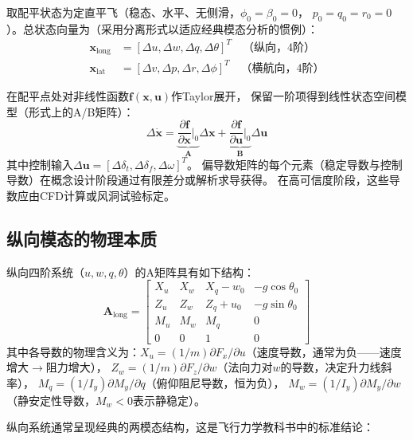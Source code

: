 \documentclass[a4paper,12pt]{ctexart}
\theoremstyle{plain}
\theoremstyle{definition}
\begin{document}
取配平状态为定直平飞（稳态、水平、无侧滑，$\phi_0 = \beta_0 = 0$，
$p_0 = q_0 = r_0 = 0$）。总状态向量为（采用分离形式以适应经典模态分析的惯例）：
\begin{align}
    \bm{x}_{\text{long}} &= [\Delta u, \Delta w, \Delta q, \Delta \theta]^T \quad \text{（纵向，4阶）} \\
    \bm{x}_{\text{lat}} &= [\Delta v, \Delta p, \Delta r, \Delta \phi]^T \quad \text{（横航向，4阶）}
\end{align}

在配平点处对非线性函数$\bm{f}(\bm{x}, \bm{u})$作Taylor展开，
保留一阶项得到线性状态空间模型（形式上的A/B矩阵）：
\begin{equation}
    \Delta \dot{\bm{x}} = \underbrace{\frac{\partial \bm{f}}{\partial \bm{x}}\bigg|_0}_{\bm{A}}
    \Delta \bm{x} + \underbrace{\frac{\partial \bm{f}}{\partial \bm{u}}\bigg|_0}_{\bm{B}}
    \Delta \bm{u}
    \label{eq:linear_state_space}
\end{equation}
其中控制输入$\Delta \bm{u} = [\Delta \delta_t, \Delta \delta_f, \Delta \omega]^T$。
偏导数矩阵的每个元素（稳定导数与控制导数）在概念设计阶段通过有限差分或解析求导获得。
在高可信度阶段，这些导数应由CFD计算或风洞试验标定。

\subsection{纵向模态的物理本质}

纵向四阶系统（$u, w, q, \theta$）的A矩阵具有如下结构：
\begin{equation}
    \bm{A}_{\text{long}} =
    \begin{bmatrix}
        X_u & X_w & X_q - w_0 & -g\cos\theta_0 \\
        Z_u & Z_w & Z_q + u_0 & -g\sin\theta_0 \\
        M_u & M_w & M_q & 0 \\
        0 & 0 & 1 & 0
    \end{bmatrix}
    \label{eq:longitudinal}
\end{equation}
其中各导数的物理含义为：$X_u = (1/m)\partial F_x/\partial u$（速度导数，通常为负——速度增大$\to$阻力增大），
$Z_w = (1/m)\partial F_z/\partial w$（法向力对$w$的导数，决定升力线斜率），
$M_q = (1/I_y)\partial M_y/\partial q$（俯仰阻尼导数，恒为负），
$M_w = (1/I_y)\partial M_y/\partial w$（静安定性导数，$M_w < 0$表示静稳定）。

纵向系统通常呈现经典的两模态结构，这是飞行力学教科书中的标准结论\cite{etkin1982dynamics,stengel2004flight}：
\end{document}
